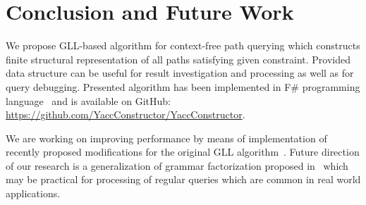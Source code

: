\section{Conclusion and Future Work}

We propose GLL-based algorithm for context-free path querying which constructs finite structural representation of all paths satisfying given constraint.
Provided data structure can be useful for result investigation and processing as well as for query debugging.
Presented algorithm has been implemented in F\# programming language~\cite{FSharp} and is available on GitHub: \url{https://github.com/YaccConstructor/YaccConstructor}.

We are working on improving performance by means of implementation of recently proposed modifications for the original GLL algorithm~\cite{FGLL,FastPracticalGLL}.
Future direction of our research is a generalization of grammar factorization proposed in~\cite{FGLL} which may be practical for processing of regular queries which are common in real world applications.

